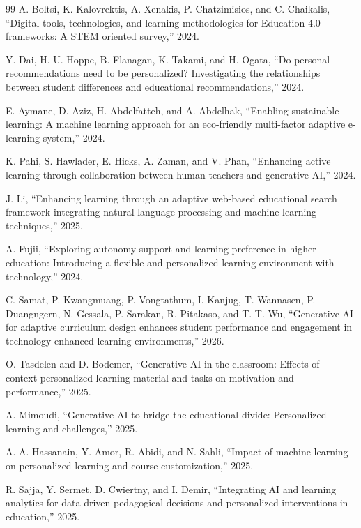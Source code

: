 \documentclass[conference]{IEEEtran}
\begin{document}
\begin{thebibliography}{99}
A. Boltsi, K. Kalovrektis, A. Xenakis, P. Chatzimisios,
and C. Chaikalis,
``Digital tools, technologies, and learning methodologies for Education 4.0
frameworks: A STEM oriented survey,'' 2024.

Y. Dai, H. U. Hoppe, B. Flanagan, K. Takami, and H. Ogata,
``Do personal recommendations need to be personalized? Investigating the
relationships between student differences and educational recommendations,''
2024.

E. Aymane, D. Aziz, H. Abdelfatteh, and A. Abdelhak,
``Enabling sustainable learning: A machine learning approach for an
eco-friendly multi-factor adaptive e-learning system,'' 2024.

K. Pahi, S. Hawlader, E. Hicks, A. Zaman, and V. Phan,
``Enhancing active learning through collaboration between human teachers
and generative AI,'' 2024.

J. Li,
``Enhancing learning through an adaptive web-based educational search
framework integrating natural language processing and machine learning
techniques,'' 2025.

A. Fujii,
``Exploring autonomy support and learning preference in higher education:
Introducing a flexible and personalized learning environment with
technology,'' 2024.

C. Samat, P. Kwangmuang, P. Vongtathum, I. Kanjug, T. Wannasen,
P. Duangngern, N. Gessala, P. Sarakan, R. Pitakaso, and T. T. Wu,
``Generative AI for adaptive curriculum design enhances student performance
and engagement in technology-enhanced learning environments,'' 2026.

O. Tasdelen and D. Bodemer,
``Generative AI in the classroom: Effects of context-personalized learning
material and tasks on motivation and performance,'' 2025.

A. Mimoudi,
``Generative AI to bridge the educational divide: Personalized learning
and challenges,'' 2025.

A. A. Hassanain, Y. Amor, R. Abidi, and N. Sahli,
``Impact of machine learning on personalized learning and course
customization,'' 2025.

R. Sajja, Y. Sermet, D. Cwiertny, and I. Demir,
``Integrating AI and learning analytics for data-driven pedagogical
decisions and personalized interventions in education,'' 2025.


\end{thebibliography}
\end{document}
